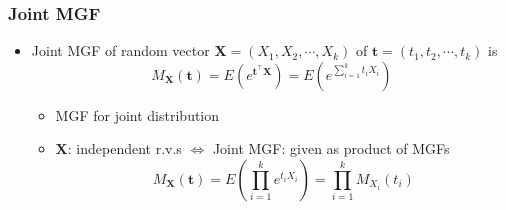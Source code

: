 \subsubsection*{Joint MGF}
\begin{itemize}
    \item Joint MGF of random vector $\mathbf{X}=\left(X_1,X_2,\cdots,X_k\right)$ of $\mathbf{t}=\left(t_1,t_2,\cdots,t_k\right)$ is
    \begin{equation}
        M_{\mathbf{X}}(\mathbf{t})=E\left(e^{\mathbf{t}^{\top}\mathbf{X}}\right)=E\left(e^{\sum_{i=1}^kt_iX_i}\right)
    \end{equation}
    \begin{itemize}
        \item MGF for joint distribution
        \item $\mathbf{X}$: independent r.v.s $\iff$ Joint MGF: given as product of MGFs
        \begin{equation}
            M_{\mathbf{X}}(\mathbf{t})=E\left(\prod_{i=1}^ke^{t_iX_i}\right)=\prod_{i=1}^kM_{X_i}(t_i)
        \end{equation}
    \end{itemize}
\end{itemize}

